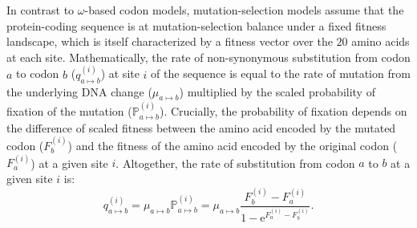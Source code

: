 \documentclass[9pt,twocolumn,twoside,lineno]{pnas-new}
\newcommand{\e}{\mathrm{e}}
\newcommand{\proba}{\mathbb{P}}
\begin{document}
{       In contrast to $\omega$-based codon models, mutation-selection models assume that the protein-coding sequence is at mutation-selection balance under a fixed fitness landscape, which is itself characterized by a fitness vector over the $20$ amino acids at each site\cite{yang_mutationselection_2008, halpern_evolutionary_1998, rodrigue_mechanistic_2010}.
       Mathematically, the rate of non-synonymous substitution from codon $a$ to codon $b$ ($q_{a \mapsto b}^{(i)}$) at site $i$ of the sequence is equal to the rate of mutation from the underlying DNA change ($\mu_{a \mapsto b}$) multiplied by the scaled probability of fixation of the mutation ($\proba_{a \mapsto b}^{(i)}$).
       Crucially, the probability of fixation depends on the difference of scaled fitness between the amino acid encoded by the mutated codon ($F_b^{(i)}$) and the fitness of the amino acid encoded by the original codon ($F_a^{(i)}$) at a given site $i$\cite{fisher_distribution_1930, wright_evolution_1931, mccandlish_modeling_2014}.
       Altogether, the rate of substitution from codon $a$ to $b$ at a given site $i$ is:
       \begin{equation}
              q_{a \mapsto b}^{(i)} = \mu_{a \mapsto b} \proba_{a \mapsto b}^{(i)} = \mu_{a \mapsto b} \dfrac{F_b^{(i)} - F_a^{(i)}}{1 - \e^{F_a^{(i)} - F_b^{(i)}}}.
       \end{equation}

}
\end{document}
